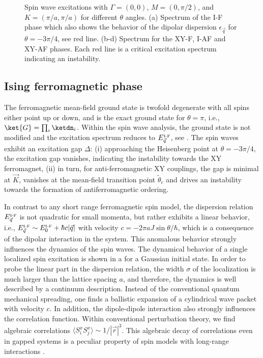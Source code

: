 \begin{figure}[ht]
    \centering
    \caption{Spin wave excitations with $\Gamma=(0,0)$, $M=(0,\pi/2)$, and $K=(\pi/a,\pi/a)$ for different $\theta$ angles. (a) Spectrum of the I-F phase which also shows the behavior of the dipolar dispersion $\epsilon_{\vec q}$ for $\theta=-3\pi/4$, see red line. (b-d) Spectrum for the XY-F, I-AF and XY-AF phases. Each red line is a critical excitation spectrum indicating an instability.}
\end{figure}



\subsection{Ising ferromagnetic phase}
The ferromagnetic mean-field ground state is twofold degenerate with all spins
either point up or down, and is the exact ground state for $\theta =
\pi$, i.e., $\ket{G} = \prod_{i} \ketdn_{i}$. Within the spin wave analysis,
the ground state is not modified and the excitation
spectrum reduces to $E_{{\vec q}}^{\mbox{\tiny I-F}}$, see .
The spin waves exhibit an excitation gap $\Delta$: (i) approaching the
Heisenberg point at $\theta = -3 \pi /4$, the excitation gap
vanishes, indicating the instability towards the XY ferromagnet, (ii) in
turn, for anti-ferromagnetic XY couplings, the gap is minimal at ${\vec K}$,
vanishes at the mean-field transition point $\tilde{\theta}_{c}$ and drives an instability towards the formation
of antiferromagnetic ordering.

In contrast to any short range ferromagnetic spin model, the
dispersion relation $E_{{\vec q}}^{\mbox{\tiny I-F}}$ is not quadratic for small momenta,
but rather exhibits a linear behavior, i.e., $E_{{\vec q}}^{\mbox{\tiny I-F}} \sim E_{0}^{\mbox{\tiny I-F}}+ \hbar c |{\vec q}|$ with
velocity $c= - 2 \pi a J \sin \theta /\hbar$, which is a consequence of the dipolar interaction in
the system. This anomalous behavior strongly influences the dynamics
of the spin waves.
The dynamical behavior of a single localized spin excitation is shown in a for a Gaussian initial state.
In order to probe the linear part in the dispersion relation, the width $\sigma$
of the localization is much larger than the lattice spacing $a$, and therefore, the dynamics is
well described by a continuum description.
Instead of the conventional quantum mechanical spreading, one finds
a ballistic expansion of a cylindrical wave packet with velocity $c$.
In addition, the dipole-dipole interaction also strongly influences the correlation function.
Within conventional perturbation theory, we find algebraic correlations $\langle S_{i}^{x} S_{j}^{x}\rangle \sim 1/|{\vec r}|^3$.
This algebraic decay of correlations even in gapped systems is a peculiar property of
spin models with long-range interactions \cite{Deng2005,Schuch2006}.



